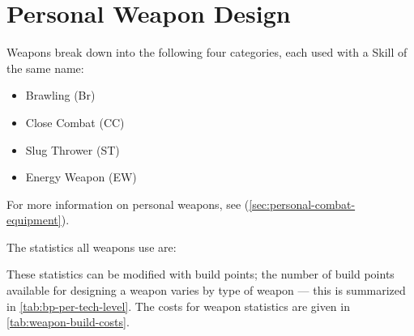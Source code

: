 \section{Personal Weapon Design}\label{sec:personal-weapon-design}

Weapons break down into the following four categories, each used with a Skill of the same name:

\begin{itemize}
\item Brawling (Br)
\item Close Combat (CC)
\item Slug Thrower (ST)
\item Energy Weapon (EW)
\end{itemize}

For more information on personal weapons, see  (\autoref{sec:personal-combat-equipment}).

The statistics all weapons use are:




These statistics can be modified with build points; the number of build points available for designing a weapon varies by type of weapon --- this is summarized in \autoref{tab:bp-per-tech-level}. The costs for weapon statistics are given in \autoref{tab:weapon-build-costs}.











